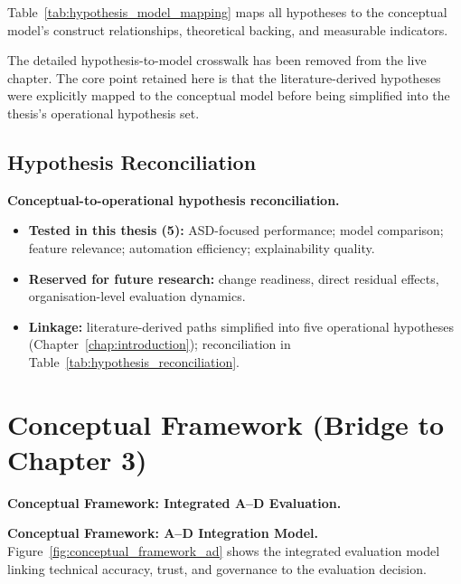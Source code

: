
Table~\ref{tab:hypothesis_model_mapping} maps all hypotheses to the conceptual model's construct relationships, theoretical backing, and measurable indicators.

\noindent The detailed hypothesis-to-model crosswalk has been removed from the live chapter. The core point retained here is that the literature-derived hypotheses were explicitly mapped to the conceptual model before being simplified into the thesis's operational hypothesis set.

\subsection{Hypothesis Reconciliation}

\noindent\textbf{Conceptual-to-operational hypothesis reconciliation.}
\begin{itemize}[leftmargin=*, itemsep=2pt]
    \item \textbf{Tested in this thesis (5):} ASD-focused performance; model comparison; feature relevance; automation efficiency; explainability quality.
    \item \textbf{Reserved for future research:} change readiness, direct residual effects, organisation-level evaluation dynamics.
    \item \textbf{Linkage:} literature-derived paths simplified into five operational hypotheses (Chapter~\ref{chap:introduction}); reconciliation in Table~\ref{tab:hypothesis_reconciliation}.
\end{itemize}


\section{Conceptual Framework (Bridge to Chapter 3)}

\noindent\textbf{Conceptual Framework: Integrated A--D Evaluation.}

\noindent\textbf{Conceptual Framework: A--D Integration Model.} Figure~\ref{fig:conceptual_framework_ad} shows the integrated evaluation model linking technical accuracy, trust, and governance to the evaluation decision.

